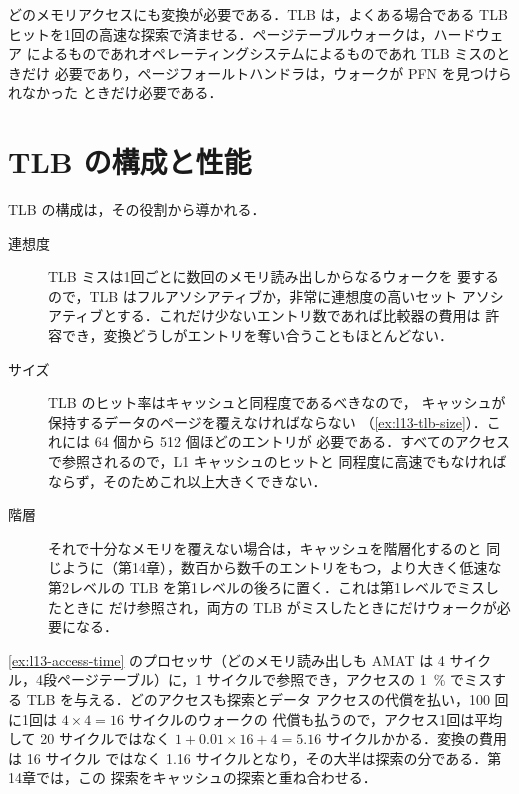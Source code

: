 \documentclass[../main.tex]{subfiles}
\begin{document}
\begin{keypoint}
  どのメモリアクセスにも変換が必要である．TLB は，よくある場合である TLB
  ヒットを1回の高速な探索で済ませる．ページテーブルウォークは，ハードウェア
  によるものであれオペレーティングシステムによるものであれ TLB ミスのときだけ
  必要であり，ページフォールトハンドラは，ウォークが PFN を見つけられなかった
  ときだけ必要である．
\end{keypoint}

\section{TLB の構成と性能}
\label{sec:l13-tlb-org}

TLB の構成は，その役割から導かれる．
\begin{description}
  \item[連想度] TLB ミスは1回ごとに数回のメモリ読み出しからなるウォークを
    要するので，TLB はフルアソシアティブか，非常に連想度の高いセット
    アソシアティブとする．これだけ少ないエントリ数であれば比較器の費用は
    許容でき，変換どうしがエントリを奪い合うこともほとんどない．
  \item[サイズ] TLB のヒット率はキャッシュと同程度であるべきなので，
    キャッシュが保持するデータのページを覆えなければならない
    （\cref{ex:l13-tlb-size}）．これには 64 個から 512 個ほどのエントリが
    必要である．すべてのアクセスで参照されるので，L1 キャッシュのヒットと
    同程度に高速でもなければならず，そのためこれ以上大きくできない．
  \item[階層] それで十分なメモリを覆えない場合は，キャッシュを階層化するのと
    同じように（第14章），数百から数千のエントリをもつ，より大きく低速な
    第2レベルの TLB を第1レベルの後ろに置く．これは第1レベルでミスしたときに
    だけ参照され，両方の TLB がミスしたときにだけウォークが必要になる．
\end{description}

\begin{example}
  \label{ex:l13-tlb-performance}
  \cref{ex:l13-access-time} のプロセッサ（どのメモリ読み出しも AMAT は 4
  サイクル，4段ページテーブル）に，1 サイクルで参照でき，アクセスの
  \SI{1}{\percent} でミスする TLB を与える．どのアクセスも探索とデータ
  アクセスの代償を払い，100 回に1回は $4 \times 4 = 16$ サイクルのウォークの
  代償も払うので，アクセス1回は平均して 20 サイクルではなく
  $1 + 0.01 \times 16 + 4 = 5.16$ サイクルかかる．変換の費用は 16 サイクル
  ではなく 1.16 サイクルとなり，その大半は探索の分である．第14章では，この
  探索をキャッシュの探索と重ね合わせる．
\end{example}
\end{document}

